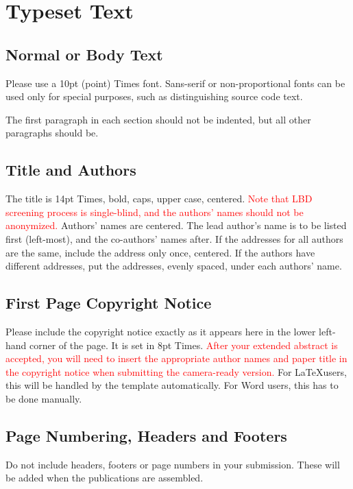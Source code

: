 \documentclass{article}
\begin{document}
\section{Typeset Text}\label{sec:typeset_text}

\subsection{Normal or Body Text}\label{subsec:body}

Please use a 10pt (point) Times font. Sans-serif or non-proportional fonts
can be used only for special purposes, such as distinguishing source code text.

The first paragraph in each section should not be indented, but all other paragraphs should be.

\subsection{Title and Authors}

The title is 14pt Times, bold, caps, upper case, centered.
\textcolor{red}{Note that LBD screening process is single-blind, and the authors' names should not be anonymized.}
Authors' names are centered.
The lead author's name is to be listed first (left-most), and the co-authors' names after.
If the addresses for all authors are the same, include the address only once, centered.
If the authors have different addresses, put the addresses, evenly spaced, under each authors' name.

\subsection{First Page Copyright Notice}

Please include the copyright notice exactly as it appears here in the lower left-hand corner of the page.
It is set in 8pt Times. \textcolor{red}{After your extended abstract is accepted, you will need to insert the appropriate author names and paper title in the copyright notice when submitting the camera-ready version.} For \LaTeX users, this will be handled by the template automatically. For Word users, this has to be done manually.


\subsection{Page Numbering, Headers and Footers}

Do not include headers, footers or page numbers in your submission.
These will be added when the publications are assembled.
\end{document}
